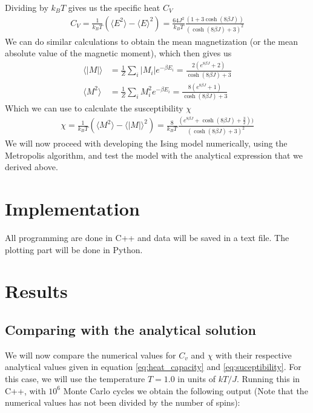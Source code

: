 \documentclass[12pt]{article}
\begin{document}
Dividing by $k_B T$ gives us the specific heat $C_V$
\begin{align}
C_V = \frac{1}{k_BT} \left( \langle E^2 \rangle
- \langle E \rangle^2 \right) = \frac{64J^2}{k_B T} \frac{(1+3\cosh(8\beta J))}{(\cosh(8\beta J) + 3)^2}
\label{eq:heat_capacity}
\end{align}
We can do similar calculations to obtain the mean magnetization (or the mean absolute value of the magnetic moment), which then gives us
\begin{align*}
\langle |M|\rangle &= \frac{1}{Z} \displaystyle \sum_i |M_i| e^{-\beta E_i} = \frac{2(e^{8\beta J} + 2)}{\cosh(8\beta J) + 3} \\
\langle M^2\rangle &= \frac{1}{Z}\displaystyle \sum_i M_i^2e^{-\beta E_i} = \frac{8(e^{8\beta J} + 1)}{\cosh(8\beta J) + 3}
\end{align*}
Which we can use to calculate the susceptibility $\chi$
\begin{align}
\chi = \frac{1}{k_B T} \left(\langle M^2 \rangle - \langle |M| \rangle^2\right) = \frac{8}{k_B T} \frac{(e^{8\beta J}+ \cosh(8\beta J) + \frac{3}{2}))}{(\cosh(8\beta J) + 3)^2}
\label{eq:suceptibility}
\end{align} 
We will now proceed with developing the Ising model numerically, using the Metropolis algorithm, and test the model with the analytical expression that we derived above.
\FloatBarrier

\section{Implementation} \label{section:implement}
All programming are done in C++ and data will be saved in a text file. The plotting part will be done in Python.

\section{Results} \label{section:result}
\subsection*{Comparing with the analytical solution}
We will now compare the numerical values for $C_v$ and $\chi$ with their respective analytical values given in equation \ref{eq:heat_capacity} and \ref{eq:suceptibility}. For this case, we will use the temperature $T = 1.0$ in units of $kT/J$. Running this in C++, with $10^6$ Monte Carlo cycles we obtain the following output (Note that the numerical values has not been divided by the number of spins):
\end{document}
